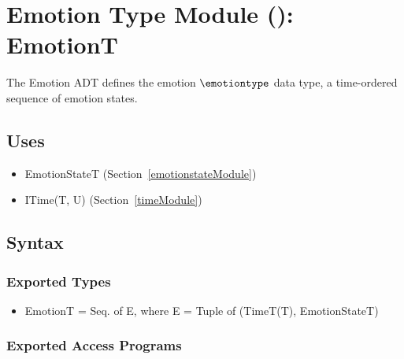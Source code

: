 \section{Emotion Type Module ():
EmotionT}\label{emotionModule}
The Emotion ADT defines the emotion $\emotiontype$ data type, a time-ordered
sequence of emotion states.

\subsection{Uses}
\begin{itemize}[noitemsep, nosep]

    \item EmotionStateT (Section~\ref{emotionstateModule})

    \item ITime(T, U) (Section~\ref{timeModule})

\end{itemize}

\subsection{Syntax}

\subsubsection{Exported Types}
\begin{itemize}

    \item EmotionT = Seq. of E, where E = Tuple of (TimeT(T), EmotionStateT)

\end{itemize}

\subsubsection{Exported Access Programs}

